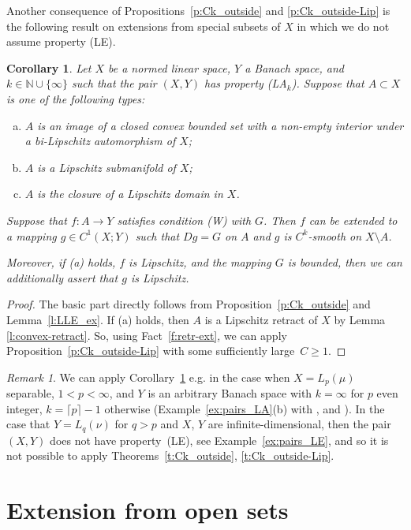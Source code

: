 \documentclass[a4paper,twoside,10pt,reqno,draft]{amsart}
\newtheorem{corollary}[theorem]{Corollary}
\theoremstyle{definition}
\theoremstyle{remark}
\newtheorem{remark}[theorem]{Remark}
\newcommand\N{{\mathbb N}}
\newcommand\pLA[1]{(LA$_#1$)}
\newcommand\pLE{(LE)}
\newcommand\cW{(W)}
\begin{document}
Another consequence of Propositions~\ref{p:Ck_outside} and \ref{p:Ck_outside-Lip} is the following result on extensions from special subsets of $X$ in which we do not assume property \pLE.
\begin{corollary}\label{c:C1ext2}
Let $X$ be a normed linear space, $Y$ a Banach space, and $k\in\N\cup\{\infty\}$ such that the pair $(X,Y)$ has property \pLA k.
Suppose that $A\subset X$ is one of the following types:
\begin{enumerate}[(a)]
\item $A$ is an image of a closed convex bounded set with a non-empty interior under a bi-Lipschitz automorphism of $X$;
\item $A$ is a Lipschitz submanifold of $X$;
\item $A$ is the closure of a Lipschitz domain in $X$.
\end{enumerate}
Suppose that $f\colon A\to Y$ satisfies condition {\cW} with $G$.
Then $f$ can be extended to a mapping $g\in C^1(X;Y)$ such that $Dg=G$ on $A$ and $g$ is $C^k$-smooth on $X\setminus A$.

Moreover, if (a) holds, $f$ is Lipschitz, and the mapping $G$ is bounded, then we can additionally assert that $g$ is Lipschitz.
\end{corollary}
\begin{proof}
The basic part directly follows from Proposition~\ref{p:Ck_outside} and Lemma~\ref{l:LLE_ex}.
If (a) holds, then $A$ is a Lipschitz retract of $X$ by Lemma \ref{l:convex-retract}.
So, using Fact~\ref{f:retr-ext}, we can apply Proposition~\ref{p:Ck_outside-Lip} with some sufficiently large~$C\ge1$.
\end{proof}

\begin{remark}\label{r:ext-nonLE}
We can apply Corollary~\ref{c:C1ext2} e.g. in the case when $X=L_p(\mu)$ separable, $1<p<\infty$, and $Y$ is an arbitrary Banach space with $k=\infty$ for $p$ even integer, $k=\lceil p\rceil-1$ otherwise
(Example~\ref{ex:pairs_LA}(b) with \cite[Cor. p~.128]{Lac}, \cite[Theorem~6.1.6]{AlKa} and \cite[Theorem~5.106]{HJ}).
In the case that $Y=L_q(\nu)$ for $q>p$ and $X$, $Y$ are infinite-dimensional, then the pair $(X,Y)$ does not have property~\pLE, see Example~\ref{ex:pairs_LE},
and so it is not possible to apply Theorems~\ref{t:Ck_outside}, \ref{t:Ck_outside-Lip}.
\end{remark}

\section{Extension from open sets}\label{sec:open_sets}
\end{document}
